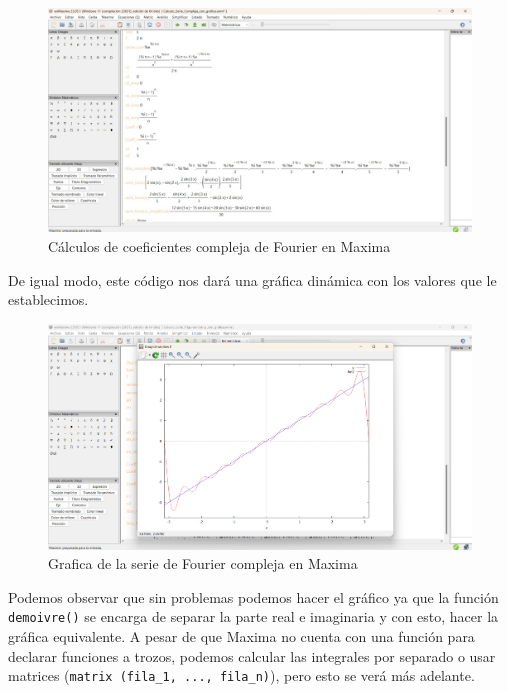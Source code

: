 \begin{figure}[H]
	\centering
	\includegraphics[width=1\textwidth]{img/chapter02/maxima-complex-series-coeff.jpeg}
	\caption{Cálculos de coeficientes compleja de Fourier en Maxima}
	\label{fig:maxima-complex-series}  %
\end{figure}
De igual modo, este código nos dará una gráfica dinámica con los valores que le establecimos.
\begin{figure}[H]
	\centering
	\includegraphics[width=1\textwidth]{img/chapter02/maxima-trig-series-graph.png}
	\caption{Grafica de la serie de Fourier compleja en Maxima}
	\label{fig:maxima-complex-series-graph}  %
\end{figure}
Podemos observar que sin problemas podemos hacer el gráfico ya que la función \texttt{demoivre()} se encarga de separar la parte real e imaginaria y con esto, hacer la gráfica equivalente.
A pesar de que Maxima no cuenta con una función para declarar funciones a trozos, podemos calcular las integrales por separado o usar matrices (\texttt{matrix (fila\_1, ..., fila\_n)}), pero esto se verá más adelante. 
